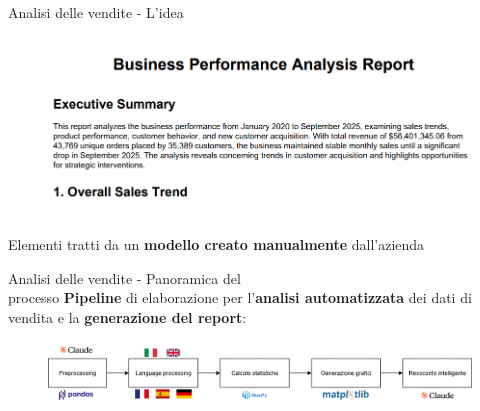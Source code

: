 \documentclass{beamer}
\begin{document}
\begin{frame}{Analisi delle vendite - L'idea}
\begin{columns}
\begin{column}{0.33\textwidth}
\begin{figure}
					\centering
					\includegraphics[width=\textwidth]{Esempio di report delle vendite - Resoconto.png}
				\end{figure}
			\end{column}
		\end{columns}

		\vspace{1em}
		Elementi tratti da un \textbf{modello creato manualmente} dall'azienda
	\end{frame}

	\begin{frame}{Analisi delle vendite - Panoramica del\\ processo}
		\textbf{Pipeline} di elaborazione per l'\textbf{analisi automatizzata} dei dati di vendita e la \textbf{generazione del report}:

		\begin{figure}
			\centering
			\includegraphics[width=\textwidth]{Diagramma pipeline analisi delle vendite.png}
		\end{figure}
	\end{frame}
\end{document}
